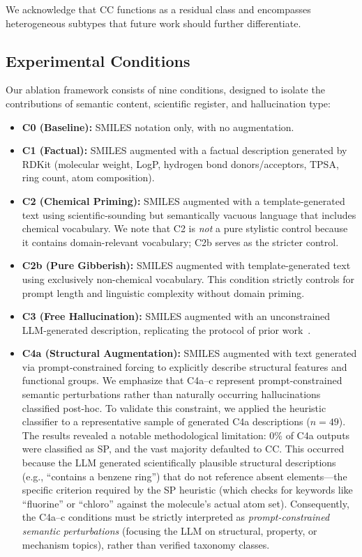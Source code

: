 We acknowledge that CC functions as a residual class and encompasses heterogeneous subtypes that future work should further differentiate.

\subsection{Experimental Conditions}
Our ablation framework consists of nine conditions, designed to isolate the contributions of semantic content, scientific register, and hallucination type:

\begin{itemize}
    \item \textbf{C0 (Baseline):} SMILES notation only, with no augmentation.
    \item \textbf{C1 (Factual):} SMILES augmented with a factual description generated by RDKit (molecular weight, LogP, hydrogen bond donors/acceptors, TPSA, ring count, atom composition).
    \item \textbf{C2 (Chemical Priming):} SMILES augmented with a template-generated text using scientific-sounding but semantically vacuous language that includes chemical vocabulary. We note that C2 is \emph{not} a pure stylistic control because it contains domain-relevant vocabulary; C2b serves as the stricter control.
    \item \textbf{C2b (Pure Gibberish):} SMILES augmented with template-generated text using exclusively non-chemical vocabulary. This condition strictly controls for prompt length and linguistic complexity without domain priming.
    \item \textbf{C3 (Free Hallucination):} SMILES augmented with an unconstrained LLM-generated description, replicating the protocol of prior work~\cite{hao2024hallucination}.
    \item \textbf{C4a (Structural Augmentation):} SMILES augmented with text generated via prompt-constrained forcing to explicitly describe structural features and functional groups. We emphasize that C4a--c represent prompt-constrained semantic perturbations rather than naturally occurring hallucinations classified post-hoc. To validate this constraint, we applied the heuristic classifier to a representative sample of generated C4a descriptions ($n=49$). The results revealed a notable methodological limitation: 0\% of C4a outputs were classified as SP, and the vast majority defaulted to CC. This occurred because the LLM generated scientifically plausible structural descriptions (e.g., ``contains a benzene ring'') that do not reference absent elements---the specific criterion required by the SP heuristic (which checks for keywords like ``fluorine'' or ``chloro'' against the molecule's actual atom set). Consequently, the C4a--c conditions must be strictly interpreted as \textit{prompt-constrained semantic perturbations} (focusing the LLM on structural, property, or mechanism topics), rather than verified taxonomy classes.

\end{itemize}
